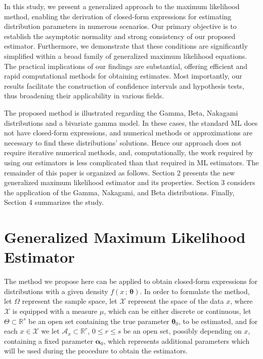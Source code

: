 \documentclass[lineno]{biometrika}
\newcommand{\bs}{\boldsymbol}
\begin{document}
In this study, we present a generalized approach to the maximum likelihood method, enabling the derivation of closed-form expressions for estimating distribution parameters in numerous scenarios. Our primary objective is to establish the asymptotic normality and strong consistency of our proposed estimator. Furthermore, we demonstrate that these conditions are significantly simplified within a broad family of generalized maximum likelihood equations. The practical implications of our findings are substantial, offering efficient and rapid computational methods for obtaining estimates. Most importantly, our results facilitate the construction of confidence intervals and hypothesis tests, thus broadening their applicability in various fields.


The proposed method is illustrated regarding the Gamma, Beta, Nakagami distributions and a bivariate gamma model. In these cases, the standard ML does not have closed-form expressions, and numerical methods or approximations are necessary to find these distributions' solutions. Hence our approach does not require iterative numerical methods, and, computationally, the work required by using our estimators is less complicated than that required in ML estimators. The remainder of this paper is organized as follows. Section 2 presents the new generalized maximum likelihood estimator and its properties. Section 3 considers the application of the Gamma, Nakagami, and Beta distributions. Finally, Section 4 summarizes the study.


\section{Generalized Maximum Likelihood Estimator}

The method we propose here can be applied to obtain closed-form expressions for distributions with a given density $f(x\,;\,\bs\theta)$. In order to formulate the method, let $\Omega$ represent the sample space, let $\mathcal{X}$ represent the space of the data $x$, where $\mathcal{X}$ is equipped with a measure $\mu$, which can be either discrete or continuous, let $\Theta\subset \mathbb{R}^{s}$ be an open set containing the true parameter $\bs{\theta}_0$, to be estimated, and for each $x\in \mathcal{X}$ we let $\mathcal{A}_x\subset \mathbb{R}^{r}$, $0\leq r\leq s$ be an open set, possibly depending on $x$, containing  a fixed parameter $\bs{\alpha}_0$, which represents additional parameters which will be used during the procedure to obtain the estimators.
\end{document}
